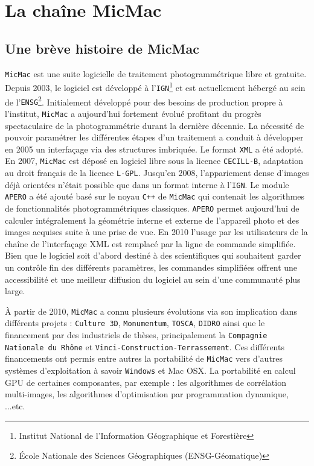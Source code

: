 \section{La chaîne MicMac}
\subsection{Une brève histoire de MicMac}
{\tt MicMac} est une suite logicielle de traitement photogrammétrique libre et gratuite. Depuis 2003, le logiciel est développé à l'{\tt IGN}\footnote{Institut National de l'Information Géographique et Forestière} et est actuellement hébergé au sein de l'{\tt ENSG}\footnote{École Nationale des Sciences Géographiques (ENSG-Géomatique)}. Initialement développé pour des besoins de production propre à l'institut, {\tt MicMac} a aujourd'hui fortement évolué profitant du progrès spectaculaire de la photogrammétrie durant la dernière décennie. La nécessité de pouvoir paramétrer les différentes étapes d'un traitement a conduit à développer en 2005 un interfaçage via des structures imbriquée. Le format {\tt XML} a été adopté. En 2007, {\tt MicMac} est déposé en logiciel libre sous la licence {\tt CECILL-B}, adaptation au droit français de la licence {\tt L-GPL}. Jusqu'en 2008, l’appariement dense d'images déjà orientées n'était possible que dans un format interne à l'{\tt IGN}. Le module {\tt APERO} a été ajouté basé sur le noyau {\tt C++} de {\tt MicMac} qui contenait les algorithmes de fonctionnalités photogrammétriques classiques. {\tt APERO} permet aujourd'hui de calculer intégralement la géométrie interne et externe de l’appareil photo et des images acquises suite à une prise de vue. En 2010 l'usage par les utilisateurs de la chaîne de l'interfaçage XML est remplacé par la ligne de commande simplifiée. Bien que le logiciel soit d’abord destiné à des scientifiques qui souhaitent garder un contrôle fin des différents paramètres, les commandes simplifiées offrent une accessibilité et une meilleur diffusion du logiciel au sein d'une communauté plus large.\newline

À partir de 2010, {\tt MicMac} a connu plusieurs évolutions via son implication dans différents projets : {\tt Culture 3D}, {\tt Monumentum}, {\tt TOSCA}, {\tt DIDRO} ainsi que le financement par des industriels de thèses, principalement la {\tt Compagnie Nationale du Rhône} et {\tt Vinci-Construction-Terrassement}. Ces différents financements ont permis entre autres la portabilité de {\tt MicMac} vers d'autres systèmes d'exploitation à savoir {\tt Windows} et {Mac OSX}. La portabilité en calcul GPU de certaines composantes, par exemple : les algorithmes de corrélation multi-images, les algorithmes d'optimisation par programmation dynamique, ...etc. 


